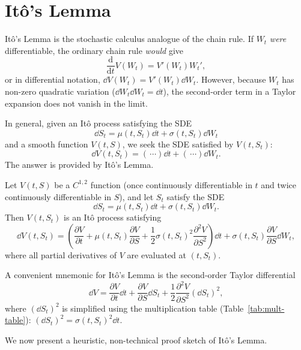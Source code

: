 \section{It\^o's Lemma}

It\^o's Lemma is the stochastic calculus analogue of the chain rule. If $W_t$ \emph{were} differentiable, the ordinary chain rule \emph{would} give
\[
\frac{\mathrm{d}}{\mathrm{d}t} V(W_t) = V'(W_t) W_t',
\]
or in differential notation, $\dd V(W_t) = V'(W_t)\dd W_t$. However, because $W_t$ has non-zero quadratic variation ($\dd W_t \dd W_t = \dd t$), the second-order term in a Taylor expansion does not vanish in the limit.

In general, given an It\^o process satisfying the SDE
\[
\dd S_t = \mu(t, S_t)\dd t + \sigma(t, S_t)\dd W_t
\]
and a smooth function $V(t, S)$, we seek the SDE satisfied by $V(t, S_t)$:
\[
\dd V(t, S_t) = (\,\cdots)\dd t + (\,\cdots)\dd W_t.
\]
The answer is provided by It\^o's Lemma.

\begin{theorem}[It\^o's Lemma]
\label{thm:ito-lemma}
Let $V(t, S)$ be a $C^{1,2}$ function (once continuously differentiable in $t$ and twice continuously differentiable in $S$), and let $S_t$ satisfy the SDE
\[
\dd S_t = \mu(t, S_t)\dd t + \sigma(t, S_t)\dd W_t.
\]
Then $V(t, S_t)$ is an It\^o process satisfying
\[
\dd V(t, S_t) = \left(\frac{\partial V}{\partial t} + \mu(t, S_t)\frac{\partial V}{\partial S} + \frac{1}{2}\sigma(t, S_t)^2 \frac{\partial^2 V}{\partial S^2}\right)\dd t + \sigma(t, S_t)\frac{\partial V}{\partial S}\dd W_t,
\]
where all partial derivatives of $V$ are evaluated at $(t, S_t)$.
\end{theorem}

\begin{note}
\label{note:ito-differential}
A convenient mnemonic for It\^o's Lemma is the second-order Taylor differential
\[
\dd V = \frac{\partial V}{\partial t}\dd t + \frac{\partial V}{\partial S}\dd S_t + \frac{1}{2}\frac{\partial^2 V}{\partial S^2}(\dd S_t)^2,
\]
where $(\dd S_t)^2$ is simplified using the multiplication table (Table~\ref{tab:mult-table}): $(\dd S_t)^2 = \sigma(t, S_t)^2 \dd t$.
\end{note}

We now present a heuristic, non-technical proof sketch of It\^o's Lemma.

